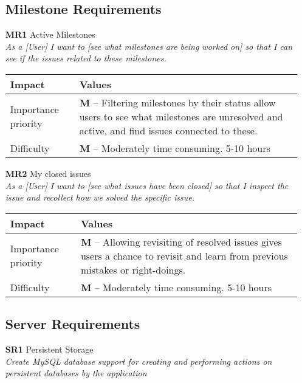 \begin{itemize}
\subsection{Milestone Requirements}
    \item[\textbf{MR1}] Active Milestones\\
        \textit{\small{As a [User] I want to [see what milestones are being worked on] so that I can see if the issues related to these milestones.}}

        \begin{tabular}{| l | p{7cm} |}
            \hline
            \rowcolor[gray]{0.8}
            \textbf{Impact} & \textbf{Values} \\
            \hline
            Importance priority & \textbf{M} -- Filtering milestones by their status allow users to see what milestones are unresolved and active, and find issues connected to these.\\
            Difficulty & \textbf{M} -- Moderately time consuming. 5-10 hours\\
            \hline
        \end{tabular}
    \vspace{0.5cm}

    \item[\textbf{MR2}] My closed issues\\
        \textit{\small{As a [User] I want to [see what issues have been closed] so that I inspect the issue and recollect how we solved the specific issue.}}

        \begin{tabular}{| l | p{7cm} |}
            \hline
            \rowcolor[gray]{0.8}
            \textbf{Impact} & \textbf{Values} \\
            \hline
            Importance priority & \textbf{M} -- Allowing revisiting of resolved issues gives users a chance to revisit and learn from previous mistakes or right-doings.\\
            Difficulty & \textbf{M} -- Moderately time consuming. 5-10 hours\\
            \hline
        \end{tabular}
    \vspace{0.5cm}

\subsection{Server Requirements}
    \item[\textbf{SR1}] Persistent Storage\\
        \textit{\small{Create MySQL database support for creating and performing actions on persistent databases by the application}}


\end{itemize}
